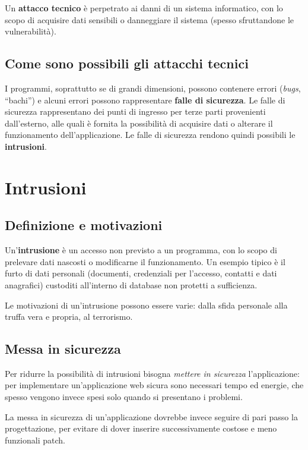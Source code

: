 Un \textbf{attacco tecnico} è perpetrato ai danni di un sistema informatico, con lo scopo di acquisire dati sensibili o danneggiare il sistema (spesso sfruttandone le vulnerabilità).

\subsection{Come sono possibili gli attacchi tecnici}

I programmi, soprattutto se di grandi dimensioni, possono contenere errori (\emph{bugs}, ``bachi'') e alcuni errori possono rappresentare \textbf{falle di sicurezza}. Le falle di sicurezza rappresentano dei punti di ingresso per terze parti provenienti dall'esterno, alle quali è fornita la possibilità di acquisire dati o alterare il funzionamento dell'applicazione. Le falle di sicurezza rendono quindi possibili le \textbf{intrusioni}.

\section{Intrusioni}

\subsection{Definizione e motivazioni}

Un'\textbf{intrusione} è un accesso non previsto a un programma, con lo scopo di prelevare dati nascosti o modificarne il funzionamento. Un esempio tipico è il furto di dati personali (documenti, credenziali per l'accesso, contatti e dati anagrafici) custoditi all'interno di database non protetti a sufficienza.

Le motivazioni di un'intrusione possono essere varie: dalla sfida personale alla truffa vera e propria, al terrorismo.

\subsection{Messa in sicurezza}

Per ridurre la possibilità di intrusioni bisogna \emph{mettere in sicurezza} l'applicazione: per implementare un'applicazione web sicura sono necessari tempo ed energie, che spesso vengono invece spesi solo quando si presentano i problemi.

La messa in sicurezza di un'applicazione dovrebbe invece seguire di pari passo la progettazione, per evitare di dover inserire successivamente costose e meno funzionali patch.

